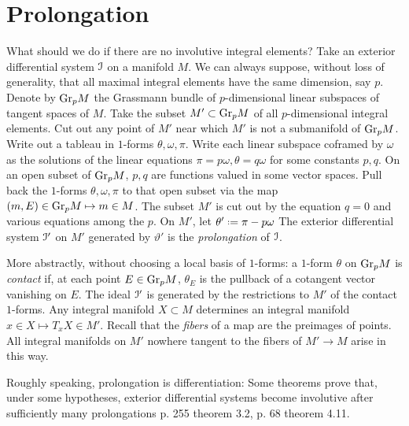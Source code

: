 \section{Prolongation}
What should we do if there are no involutive integral elements?
Take an exterior differential system \(\mathcal{I}\) on a manifold \(M\).
We can always suppose, without loss of generality, that all maximal integral elements have the same dimension, say \(p\).
Denote by \(\operatorname{Gr}_{p}\!M\) the Grassmann bundle of \(p\)-dimensional linear subspaces of tangent spaces of \(M\).
Take the subset \(M' \subset \operatorname{Gr}_{p}\!M\) of all \(p\)-dimensional integral elements.
Cut out any point of \(M'\) near which \(M'\) is not a submanifold of \(\operatorname{Gr}_{p}\!M\).
Write out a tableau in \(1\)-forms \(\theta,\omega,\pi\).
Write each linear subspace coframed by \(\omega\) as the solutions of the linear equations \(\pi=p\omega,\theta=q\omega\) for some constants \(p,q\).
On an open subset of \(\operatorname{Gr}_{p}\!M\), \(p,q\) are functions valued in some vector spaces.
Pull back the \(1\)-forms \(\theta, \omega, \pi\) to that open subset via the map  \((m,E) \in \operatorname{Gr}_{p}\!M \mapsto m \in M\).
The subset \(M'\) is cut out by the equation \(q=0\) and various equations among the \(p\).
On \(M'\), let \(\theta'\defeq\pi-p\omega\)
The exterior differential system \(\mathcal{I}'\) on \(M'\) generated by \(\vartheta'\) is the \emph{prolongation} of \(\mathcal{I}\).

More abstractly, without choosing a local basis of \(1\)-forms: a \(1\)-form \(\theta\) on \(\operatorname{Gr}_{p}\!M\) is \emph{contact} if, at each point \(E\in\operatorname{Gr}_{p}\!M\),  \(\theta_E\) is the pullback of a cotangent vector vanishing on \(E\).
The ideal \(\mathcal{I}'\) is generated by the restrictions to \(M'\) of the contact \(1\)-forms.
Any integral manifold \(X \subset M\) determines an integral manifold \(x \in X \mapsto T_x X \in M'\).
Recall that the \emph{fibers} of a map are the preimages of points.
All integral manifolds on \(M'\) nowhere tangent to the fibers of \(M' \to M\) arise in this way.

Roughly speaking, prolongation is differentiation:
Some theorems prove that, under some hypotheses, exterior differential systems become involutive after sufficiently many prolongations \cite{BCGGG:1991} p. 255 theorem 3.2, \cite{Malgrange:2005} p. 68 theorem 4.11.

